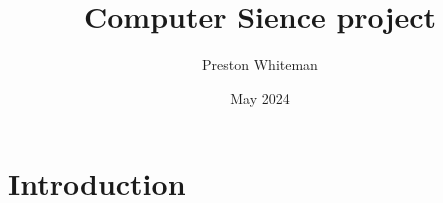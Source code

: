 \documentclass{article}
\title{Computer Sience project}
\author{Preston Whiteman}
\date{May 2024}
\begin{document}
\maketitle

\section{Introduction}
\end{document}

